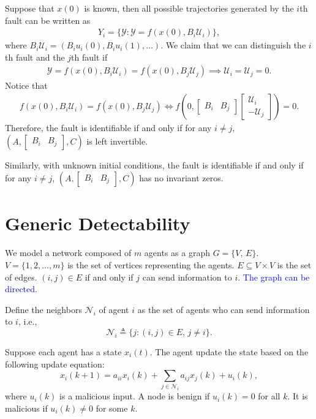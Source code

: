 \documentclass{article}
\newcommand{\y}{{\mathcal Y}}
\renewcommand{\u}{{\mathcal U}}
\newcommand{\comment}[1]{\textcolor{blue}{#1}}
\newcommand{\comment}[1]{}
\begin{document}
Suppose that $x(0)$ is known, then all possible trajectories generated by the $i$th fault can be written as
\begin{align*}
  Y_i = \{\y:\y = f(x(0), B_i\u_i)\},
\end{align*}
where $B_i \u_i = (B_i u_i(0),B_iu_i(1),\dots)$. We claim that we can distinguish the $i$th fault and the $j$th fault if 
\begin{align*}
 \y = f(x(0),B_i\u_i) =  f(x(0),B_j\u_j)\implies \u_i = \u_j = 0.
\end{align*}
Notice that
\begin{align*}
  f(x(0),B_i\u_i) =  f(x(0),B_j\u_j)\Leftrightarrow f\left(0,\begin{bmatrix}B_i &B_j\end{bmatrix}\begin{bmatrix}\u_i\\-\u_j\end{bmatrix}\right)=0.
\end{align*}
Therefore, the fault is identifiable if and only if for any $i\neq j$, $(A,\begin{bmatrix}B_i&B_j\end{bmatrix},C)$ is left invertible.

  Similarly, with unknown initial conditions, the fault is identifiable if and only if for any $i\neq j$, $(A,\begin{bmatrix}B_i&B_j\end{bmatrix},C)$ has no invariant zeros.

\section{Generic Detectability}

We model a network composed of $m$ agents as a graph $G = \{V,\,E\}$. $V = \{1,2,\ldots,m\}$ is the set of vertices representing the agents. $E \subseteq V\times V$ is the set of edges. $(i,j)\in E$ if and only if $j$ can send information to $i$. \comment{The graph can be directed.}

Define the neighbors $\mathcal N_i$ of agent $i$ as the set of agents who can send information to $i$, i.e.,
\begin{displaymath}
  \mathcal N_i \triangleq \{j:(i,j)\in E,\,j\neq i\}.
\end{displaymath}

Suppose each agent has a state $x_i(t)$. The agent update the state based on the following update equation:
\begin{displaymath}
  x_i(k+1) = a_{ii} x_i(k) + \sum_{j\in \mathcal N_i} a_{ij} x_j(k) + u_i(k),
\end{displaymath}
where $u_i(k)$ is a malicious input. A node is benign if $u_i(k)=0$ for all $k$. It is malicious if $u_i(k)\neq 0$ for some $k$.
\end{document}
